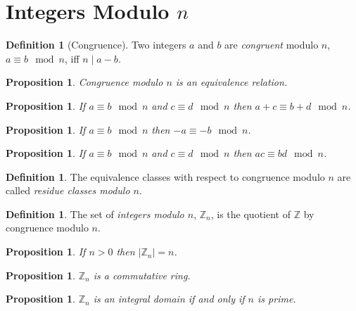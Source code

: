 \documentclass{article}
\newtheorem{proposition}[axiom]{Proposition}
\theoremstyle{definition}
\newtheorem{definition}[axiom]{Definition}
\begin{document}
    \section{Integers Modulo $n$}

    \begin{definition}[Congruence]
        Two integers $a$ and $b$ are \emph{congruent} modulo $n$, $a \equiv b \mod n$, iff $n \mid a - b$.
    \end{definition}

    \begin{proposition}
        Congruence modulo $n$ is an equivalence relation.
    \end{proposition}

    \begin{proposition}
        If $a \equiv b \mod n$ and $c \equiv d \mod n$ then $a + c \equiv b + d \mod n$.
    \end{proposition}

    \begin{proposition}
        If $a \equiv b \mod n$ then $-a \equiv -b \mod n$.
    \end{proposition}

    \begin{proposition}
        If $a \equiv b \mod n$ and $c \equiv d \mod n$ then $ac \equiv bd \mod n$.
    \end{proposition}

    \begin{definition}
        The equivalence classes with respect to congruence modulo $n$ are called \emph{residue classes modulo $n$}.
    \end{definition}

    \begin{definition}
        The set of \emph{integers modulo $n$}, $\mathbb{Z}_n$, is the quotient of $\mathbb{Z}$ by 
        congruence modulo $n$.
    \end{definition}

    \begin{proposition}
        If $n > 0$ then $|\mathbb{Z}_n| = n$.
    \end{proposition}

    \begin{proposition}
        $\mathbb{Z}_n$ is a commutative ring.
    \end{proposition}

    \begin{proposition}
        $\mathbb{Z}_n$ is an integral domain if and only if $n$ is prime.
    \end{proposition}
\end{document}
